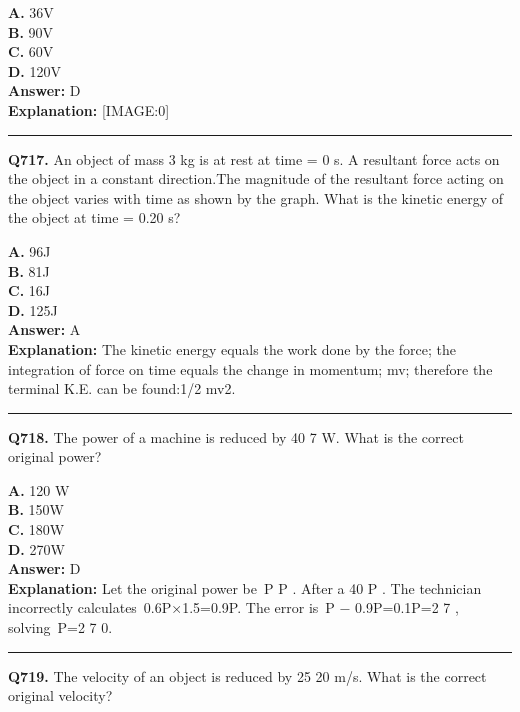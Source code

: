 \documentclass[12pt]{article}
\begin{document}
\textbf{A.} 36V \\
\textbf{B.} 90V \\
\textbf{C.} 60V \\
\textbf{D.} 120V \\

\textbf{Answer:} D \\
\textbf{Explanation:} [IMAGE:0]

\hrule
\vspace{1em}


\noindent
\textbf{Q717.} An object of mass 3 kg is at rest at time = 0 s. A resultant force acts on the object in a constant direction.The magnitude of the resultant force acting on the object varies with time as shown by the graph.
What is the kinetic energy of the object at time = 0.20 s?



\textbf{A.} 96J \\
\textbf{B.} 81J \\
\textbf{C.} 16J \\
\textbf{D.} 125J \\

\textbf{Answer:} A \\
\textbf{Explanation:} The kinetic energy equals the work done by the force; the integration of force on time equals the change in momentum; mv; therefore the terminal K.E. can be found:1/2 mv2.

\hrule
\vspace{1em}


\noindent
\textbf{Q718.} The power of a machine is reduced by 40%
7
W. What is the correct original power?



\textbf{A.} 120 W \\
\textbf{B.} 150W \\
\textbf{C.} 180W \\
\textbf{D.} 270W \\

\textbf{Answer:} D \\
\textbf{Explanation:} Let the original power be P
P
. After a 40%
P
. The technician incorrectly calculates 0.6P×1.5=0.9P. The error is P
−
0.9P=0.1P=2
7
, solving P=2
7
0.

\hrule
\vspace{1em}


\noindent
\textbf{Q719.} The velocity of an object is reduced by 25%
20
m/s. What is the correct original velocity?
\end{document}
